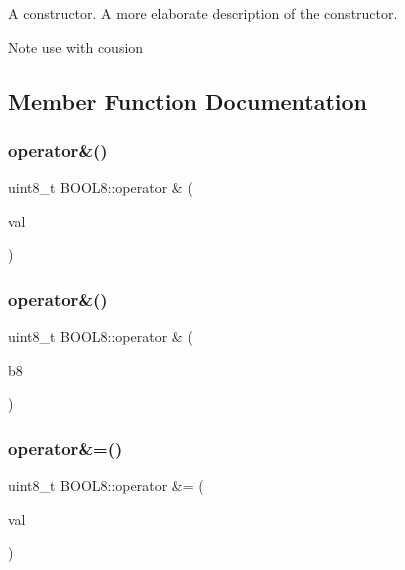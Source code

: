 A constructor. A more elaborate description of the constructor. \begin{DoxyNote}{Note}
use with cousion 
\end{DoxyNote}


\subsection{Member Function Documentation}
\hypertarget{struct_b_o_o_l8_a5e3a6bbe953bf6398e6ca4c6187091a6}{}\label{struct_b_o_o_l8_a5e3a6bbe953bf6398e6ca4c6187091a6} 
\subsubsection{\texorpdfstring{operator\&()}{operator\&()}\hspace{0.1cm}{\footnotesize\ttfamily [1/2]}}
{\footnotesize\ttfamily uint8\+\_\+t B\+O\+O\+L8\+::operator \& (\begin{DoxyParamCaption}\item[{const uint8\+\_\+t}]{val }\end{DoxyParamCaption})\hspace{0.3cm}{\ttfamily [inline]}}

\hypertarget{struct_b_o_o_l8_a21d931374d9d1261914840eb3d048ba5}{}\label{struct_b_o_o_l8_a21d931374d9d1261914840eb3d048ba5} 
\subsubsection{\texorpdfstring{operator\&()}{operator\&()}\hspace{0.1cm}{\footnotesize\ttfamily [2/2]}}
{\footnotesize\ttfamily uint8\+\_\+t B\+O\+O\+L8\+::operator \& (\begin{DoxyParamCaption}\item[{const \hyperlink{struct_b_o_o_l8}{B\+O\+O\+L8}}]{b8 }\end{DoxyParamCaption})\hspace{0.3cm}{\ttfamily [inline]}}

\hypertarget{struct_b_o_o_l8_a55559ec3a2040be9d93af7215181520e}{}\label{struct_b_o_o_l8_a55559ec3a2040be9d93af7215181520e} 
\subsubsection{\texorpdfstring{operator\&=()}{operator\&=()}\hspace{0.1cm}{\footnotesize\ttfamily [1/2]}}
{\footnotesize\ttfamily uint8\+\_\+t B\+O\+O\+L8\+::operator \&= (\begin{DoxyParamCaption}\item[{const uint8\+\_\+t}]{val }\end{DoxyParamCaption})\hspace{0.3cm}{\ttfamily [inline]}}

